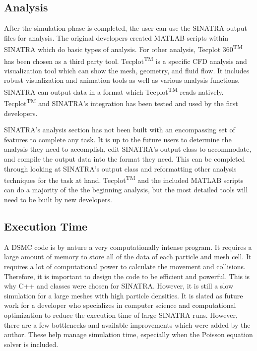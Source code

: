 

\subsection{Analysis}


 After the simulation phase is completed, the user can use the SINATRA output files for analysis. The original developers created MATLAB scripts within SINATRA which do basic types of analysis. For other analysis, Tecplot 360\textsuperscript{TM} \cite{tecplot} has been chosen as a third party tool. Tecplot\textsuperscript{TM} is a specific CFD analysis and visualization tool which can show the mesh, geometry, and fluid flow. It includes robust visualization and animation tools as well as various analysis functions. SINATRA can output data in a format which Tecplot\textsuperscript{TM} reads natively. Tecplot\textsuperscript{TM} and SINATRA's integration has been tested and used by the first developers.\par
 \indent SINATRA's analysis section has not been built with an encompassing set of features to complete any task. It is up to the future users to determine the analysis they need to accomplish, edit SINATRA's output class to accommodate, and compile the output data into the format they need. This can be completed through looking at SINATRA's output class and reformatting other analysis techniques for the task at hand. Tecplot\textsuperscript{TM} and the included MATLAB scripts can do a majority of the the beginning analysis, but the most detailed tools will need to be built by new developers. 



 
 
\subsection{Execution Time}
A DSMC code is by nature a very computationally intense program. It requires a large amount of memory to store all of the data of each particle and mesh cell. It requires a lot of computational power to calculate the movement and collisions. Therefore, it is important to design the code to be efficient and powerful. This is why C++ and classes were chosen for SINATRA. However, it is still a slow simulation for a large meshes with high particle densities. It is slated as future work for a developer who specializes in computer science and computational optimization to reduce the execution time of large SINATRA runs. However, there are a few bottlenecks and available improvements which were added by the author. These help manage simulation time, especially when the Poisson equation solver is included.\par

